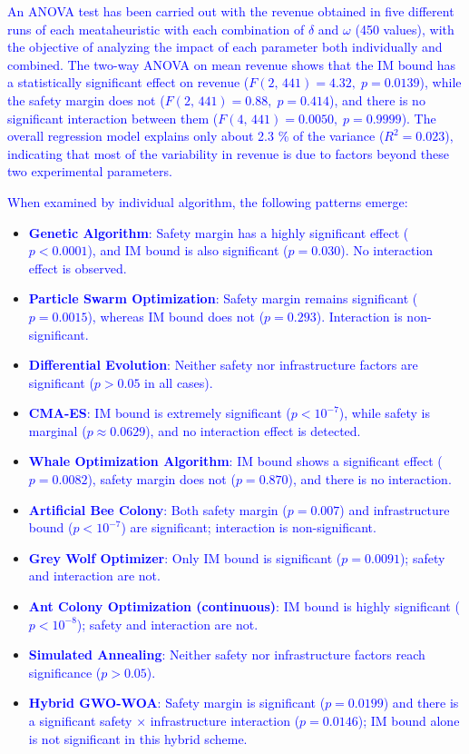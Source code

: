 \documentclass[Afour,sagev,times]{sagej}
\newcommand{\primero}[1]{\textcolor{blue}{#1}}
\begin{document}
\primero{An ANOVA test has been carried out with the revenue obtained in five different runs of each meataheuristic with each combination of $\delta$ and $\omega$ (450 values), with the objective of analyzing the impact of each parameter both individually and combined. The two-way ANOVA on mean revenue shows that the \gls{IM} bound has a statistically significant effect on revenue (\(F(2,\,441)=4.32,\;p=0.0139\)), while the safety margin does not (\(F(2,\,441)=0.88,\;p=0.414\)), and there is no significant interaction between them (\(F(4,\,441)=0.0050,\;p=0.9999\)).  The overall regression model explains only about 2.3 \% of the variance (\(R^2=0.023\)), indicating that most of the variability in revenue is due to factors beyond these two experimental parameters.}

\primero{
When examined by individual algorithm, the following patterns emerge:}
\begin{itemize}
    \item \primero{\textbf{Genetic Algorithm}: Safety margin has a highly significant effect (\(p<0.0001\)), and \gls{IM} bound is also significant (\(p=0.030\)). No interaction effect is observed.}
    \item \primero{\textbf{Particle Swarm Optimization}: Safety margin remains significant (\(p=0.0015\)), whereas \gls{IM} bound does not (\(p=0.293\)). Interaction is non-significant.}
    \item \primero{\textbf{Differential Evolution}: Neither safety nor infrastructure factors are significant (\(p>0.05\) in all cases).}
    \item \primero{\textbf{CMA-ES}: \gls{IM} bound is extremely significant (\(p<10^{-7}\)), while safety is marginal (\(p\approx0.0629\)), and no interaction effect is detected.}
    \item \primero{\textbf{Whale Optimization Algorithm}: \gls{IM} bound shows a significant effect (\(p=0.0082\)), safety margin does not (\(p=0.870\)), and there is no interaction.}
    \item \primero{\textbf{Artificial Bee Colony}: Both safety margin (\(p=0.007\)) and infrastructure bound (\(p<10^{-7}\)) are significant; interaction is non-significant.}
    \item \primero{\textbf{Grey Wolf Optimizer}: Only \gls{IM} bound is significant (\(p=0.0091\)); safety and interaction are not.}
    \item \primero{\textbf{Ant Colony Optimization (continuous)}: \gls{IM} bound is highly significant (\(p<10^{-8}\)); safety and interaction are not.}
    \item \primero{\textbf{Simulated Annealing}: Neither safety nor infrastructure factors reach significance (\(p>0.05\)).}
    \item \primero{\textbf{Hybrid GWO-WOA}: Safety margin is significant (\(p=0.0199\)) and there is a significant safety × infrastructure interaction (\(p=0.0146\)); \gls{IM} bound alone is not significant in this hybrid scheme.}
\end{itemize}
\end{document}
